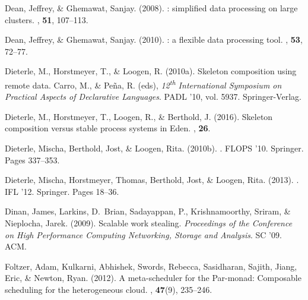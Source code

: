 \documentclass{jfp1}
\DeclareRobustCommand{\xth}{\textsuperscript{th}\xspace}
\DeclareRobustCommand{\xth}{\textsuperscript{th}\xspace}
\begin{document}
\begin{thebibliography}{}
Dean, Jeffrey, \& Ghemawat, Sanjay. (2008).
: simplified data processing on large clusters.
, {\bf 51}, 107--113.

Dean, Jeffrey, \& Ghemawat, Sanjay. (2010).
: a flexible data processing tool.
, {\bf 53}, 72--77.

Dieterle, M., Horstmeyer, T., \& Loogen, R. (2010a).
\newblock Skeleton composition using remote data.
 Carro, M., \& Pe\~{n}a, R. (eds), {\em 12\xth
  International Symposium on Practical Aspects of Declarative Languages}.
\newblock PADL '10, vol. 5937.
\newblock Springer-Verlag.

Dieterle, M., Horstmeyer, T., Loogen, R., \& Berthold, J. (2016).
\newblock Skeleton composition versus stable process systems in {Eden}.
, {\bf 26}.

Dieterle, Mischa, Berthold, Jost, \& Loogen, Rita. (2010b).
.
\newblock FLOPS '10.
\newblock Springer.
\newblock Pages  337--353.

Dieterle, Mischa, Horstmeyer, Thomas, Berthold, Jost, \& Loogen, Rita. (2013).
.
\newblock IFL '12.
\newblock Springer.
\newblock Pages  18--36.

Dinan, James, Larkins, D.~Brian, Sadayappan, P., Krishnamoorthy, Sriram, \&
  Nieplocha, Jarek. (2009).
\newblock Scalable work stealing.
 {\em Proceedings of the Conference on
  High Performance Computing Networking, Storage and Analysis}.
\newblock SC '09.
\newblock ACM.

Foltzer, Adam, Kulkarni, Abhishek, Swords, Rebecca, Sasidharan, Sajith, Jiang,
  Eric, \& Newton, Ryan. (2012).
\newblock A meta-scheduler for the {Par}-monad: Composable scheduling for the
  heterogeneous cloud.
, {\bf 47}(9), 235--246.


\end{thebibliography}
\end{document}
